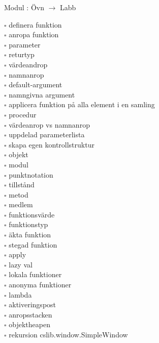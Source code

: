 
Modul : Övn  $\rightarrow$ Labb 
\begin{multicols}{3}\SlideFontTiny
$\square$ definera funktion \\
$\square$ anropa funktion \\
$\square$ parameter \\
$\square$ returtyp \\
$\square$ värdeandrop \\
$\square$ namnanrop \\
$\square$ default-argument \\
$\square$ namngivna argument \\
$\square$ applicera funktion på alla element i en samling \\
$\square$ procedur \\
$\square$ värdeanrop vs namnanrop \\
$\square$ uppdelad parameterlista \\
$\square$ skapa egen kontrollstruktur \\
$\square$ objekt \\
$\square$ modul \\
$\square$ punktnotation \\
$\square$ tillstånd \\
$\square$ metod \\
$\square$ medlem \\
$\square$ funktionsvärde \\
$\square$ funktionstyp \\
$\square$ äkta funktion \\
$\square$ stegad funktion \\
$\square$ apply \\
$\square$ lazy val \\
$\square$ lokala funktioner \\
$\square$ anonyma funktioner \\
$\square$ lambda \\
$\square$ aktiveringspost \\
$\square$ anropsstacken \\
$\square$ objektheapen \\
$\square$ rekursion 
 cslib.window.SimpleWindow \\     
\end{multicols}
